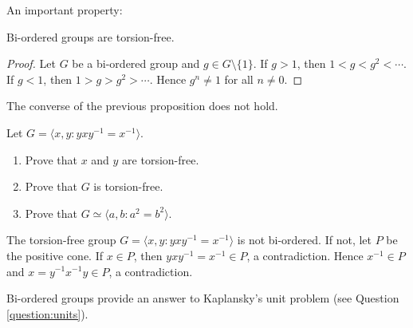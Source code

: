 An important property:

\begin{proposition}
	\label{pro:BOsintorsion}
	Bi-ordered groups are torsion-free.
\end{proposition}

\begin{proof}
	Let $G$ be a bi-ordered group and $g\in G\setminus\{1\}$. 
	If $g>1$, then
	$1<g<g^2<\cdots$. If $g<1$, then $1>g>g^2>\cdots$. Hence $g^n\ne 1$ 
	for all $n\ne 0$. 
\end{proof}

The converse of the previous proposition does not hold. 

\begin{exercise}
Let $G=\langle x,y:yxy^{-1}=x^{-1}\rangle$. 
\begin{enumerate}
    \item Prove that $x$ and $y$ are torsion-free. 
    \item Prove that $G$ is torsion-free. 
    \item Prove that $G\simeq \langle a,b:a^2=b^2\rangle$.
\end{enumerate}
\end{exercise}



\begin{example}
	The torsion-free group $G=\langle x,y:yxy^{-1}=x^{-1}\rangle$ is not bi-ordered. 
	If not, let $P$ 
	be the positive cone. If $x\in P$, 
	then $yxy^{-1}=x^{-1}\in P$, a contradiction. Hence $x^{-1}\in P$
	and $x=y^{-1}x^{-1}y\in P$, a contradiction.
\end{example}

Bi-ordered groups provide 
an answer to Kaplansky's unit problem (see Question \ref{question:units}).

